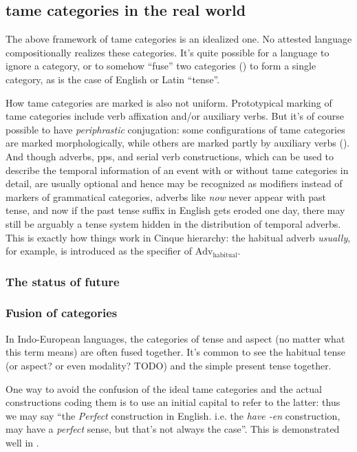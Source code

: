\documentclass[UTF8, a4paper, oneside, scheme=plain]{ctexart}
\newcommand*{\citepage}[1]{pp.~{#1}}
\newcommand*{\term}[1]{\emph{#1}}
\newcommand*{\corpus}[1]{\emph{#1}}
\begin{document}
\subsection{\ac{tame} categories in the real world}

The above framework of \ac{tame} categories is an idealized one.
No attested language compositionally realizes these categories.
It's quite possible for a language to ignore a category,
or to somehow ``fuse'' two categories ()
to form a single category,
as is the case of English or Latin ``tense''.

How \ac{tame} categories are marked is also not uniform.
Prototypical marking of \ac{tame} categories include 
verb affixation and/or auxiliary verbs.
But it's of course possible to have \emph{periphrastic} conjugation:
some configurations of \ac{tame} categories are marked morphologically,
while others are marked partly by auxiliary verbs ().
And though adverbs, \acs{pp}s, and serial verb constructions,
which can be used to describe the temporal information of an event 
with or without \ac{tame} categories in detail,
are usually optional 
and hence may be recognized as modifiers instead of markers of grammatical categories,
adverbs like \corpus{now} never appear with past tense,
and now if the past tense suffix in English gets eroded one day,
there may still be arguably a tense system
hidden in the distribution of temporal adverbs.
This is exactly how things work in Cinque hierarchy:
the habitual adverb \corpus{usually}, for example,
is introduced as the specifier of $\text{Adv}_{\text{habitual}}$.


\subsubsection{The status of future}

\subsubsection{Fusion of categories}\label{sec:fusion-of-tame}

In Indo-European languages, the categories of tense and aspect (no matter what this term means)
are often fused together.
It's common to see the habitual tense (or aspect? or even modality? TODO) 
and the simple present tense together.

One way to avoid the confusion of the ideal \ac{tame} categories 
and the actual constructions coding them 
is to use an initial capital to refer to the latter:
thus we may say ``the \term{Perfect} construction in English. i.e. the \corpus{have -en} construction,
may have a \term{perfect} sense, but that's not always the case''.
This is demonstrated well in \citet[\citepage{1091}]{jacques2021grammar}.
\end{document}

